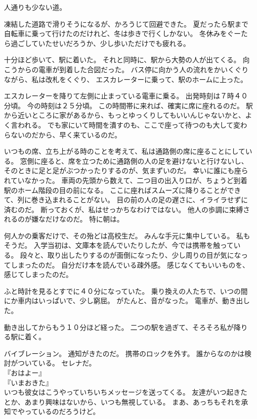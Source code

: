 \documentclass[../IHMain]{subfiles}
\begin{document}
人通りも少ない道。

凍結した道路で滑りそうになるが、かろうじて回避できた。
夏だったら駅まで自転車に乗って行けたのだけれど、冬は歩きで行くしかない。
冬休みをぐーたら過ごしていたせいだろうか、少し歩いただけでも疲れる。

十分ほど歩いて、駅に着いた。
それと同時に、駅から大勢の人が出てくる。
向こうからの電車が到着した合図だった。
バス停に向かう人の流れをかいくぐりながら、私は改札をくぐり、
エスカレーターに乗って、駅のホームに上った。

エスカレーターを降りて左側に止まっている電車に乗る。
出発時刻は７時４０分頃。
今の時刻は２５分頃。
この時間帯に来れば、確実に席に座れるのだ。
駅から近いところに家があるから、もっとゆっくりしてもいいんじゃないかと、よく言われる。
でも家にいて時間を潰すのも、ここで座って待つのも大して変わらないのだから、早く来ているのだ。

いつもの席、立ち上がる時のことを考えて、私は通路側の席に座ることにしている。
窓側に座ると、席を立つために通路側の人の足を避けないと行けないし、
そのときに足と足がぶつかったりするのが、気まずいのだ。
幸いに誰にも座られていなかった。
車両の先頭から数えて、二つ目の出入り口が、ちょうど到着駅のホーム階段の目の前になる。
ここに座ればスムーズに降りることができて、列に巻き込まれることがない。
目の前の人の足の遅さに、イライラせずに済むのだ。
断っておくが、私はせっかちなわけではない。
他人の歩調に束縛されるのが嫌なだけなのだ。
特に朝は。

何人かの乗客だけで、その殆どは高校生だ。
みんな手元に集中している。
私もそうだ。
入学当初は、文庫本を読んでいたりしたが、今では携帯を触っている。
段々と、取り出したりするのが面倒になったり、少し周りの目が気になってしまったのだ。
自分だけ本を読んでいる疎外感。
感じなくてもいいものを、感じてしまったのだ。

ふと時計を見るとすでに４０分になっていた。
乗り換えの人たちで、いつの間にか車内はいっぱいで、少し窮屈。
がたんと、音がなった。
電車が、動き出した。

動き出してからもう１０分ほど経った。
二つの駅を過ぎて、そろそろ私が降りる駅に着く。

バイブレーション。
通知がきたのだ。
携帯のロックを外す。
誰からなのかは検討がついている。
セレナだ。\\
『おはよー』\\
『いまおきた』\\
いつも彼女はこうやっていちいちメッセージを送ってくる。
友達がいつ起きたとか、あまり興味はないから、いつも無視している。
まあ、あっちもそれを承知でやっているのだろうけど。
\end{document}
